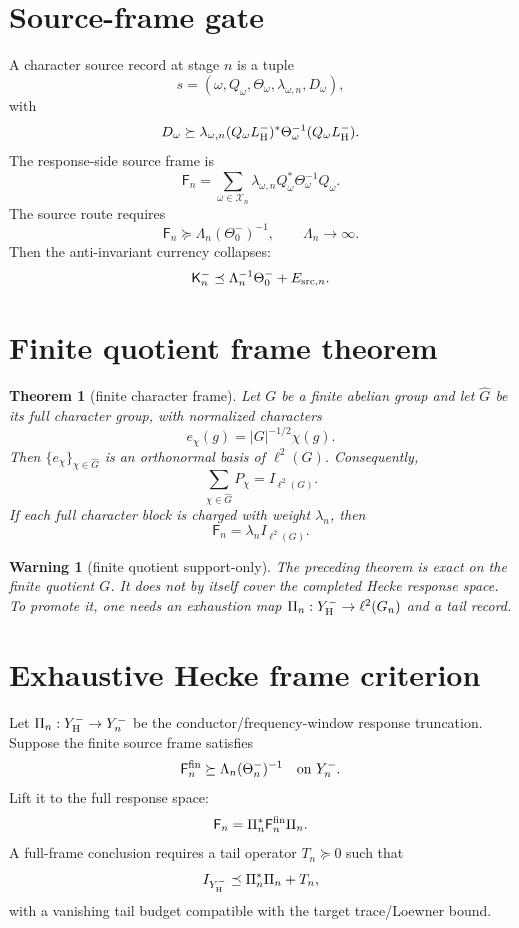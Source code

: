 \documentclass[11pt]{article}
\newtheorem{theorem}{Theorem}
\newtheorem{warning}{Warning}
\newcommand{\cK}{\mathsf K}
\newcommand{\cF}{\mathsf F}
\newcommand{\cX}{\mathcal X}
\newcommand{\pre}{\preceq}
\begin{document}
\section{Source-frame gate}
A character source record at stage \(n\) is a tuple
\[
  s=(\omega,Q_\omega,\Theta_\omega,\lambda_{\omega,n},D_\omega),
\]
with
\[
  D_\omega\succeq \lambda_{\omega,n}(Q_\omega L^-_{\rm H})^*\Theta_\omega^{-1}(Q_\omega L^-_{\rm H}).
\]
The response-side source frame is
\[
  \cF_n=\sum_{\omega\in\cX_n}\lambda_{\omega,n}Q_\omega^*\Theta_\omega^{-1}Q_\omega.
\]
The source route requires
\[
  \boxed{\cF_n\succeq \Lambda_n(\Theta_0^-)^{-1},\qquad \Lambda_n\to\infty.}
\]
Then the anti-invariant currency collapses:
\[
  \cK_n^-\pre \Lambda_n^{-1}\Theta_0^- + E_{{\rm src},n}.
\]

\section{Finite quotient frame theorem}
\begin{theorem}[finite character frame]
Let \(G\) be a finite abelian group and let \(\widehat G\) be its full character group, with normalized characters
\[
  e_\chi(g)=|G|^{-1/2}\chi(g).
\]
Then \(\{e_\chi\}_{\chi\in\widehat G}\) is an orthonormal basis of \(\ell^2(G)\).  Consequently,
\[
  \sum_{\chi\in\widehat G} P_\chi=I_{\ell^2(G)}.
\]
If each full character block is charged with weight \(\lambda_n\), then
\[
  \cF_n=\lambda_n I_{\ell^2(G)}.
\]
\end{theorem}

\begin{warning}[finite quotient support-only]
The preceding theorem is exact on the finite quotient \(G\).  It does not by itself cover the completed Hecke response space.  To promote it, one needs an exhaustion map \(\Pi_n:Y^-_{\rm H}\to \ell^2(G_n)\) and a tail record.
\end{warning}

\section{Exhaustive Hecke frame criterion}
Let \(\Pi_n:Y^-_{\rm H}\to Y^-_n\) be the conductor/frequency-window response truncation.  Suppose the finite source frame satisfies
\[
  \cF_{n}^{\rm fin}\succeq \Lambda_n (\Theta_{n}^-)^{-1}
  \quad\text{on }Y^-_n.
\]
Lift it to the full response space:
\[
  \cF_n=\Pi_n^*\cF_{n}^{\rm fin}\Pi_n.
\]
A full-frame conclusion requires a tail operator \(T_n\succeq0\) such that
\[
  I_{Y^-_{\rm H}}\preceq \Pi_n^*\Pi_n+T_n,
\]
with a vanishing tail budget compatible with the target trace/Loewner bound.
\end{document}
